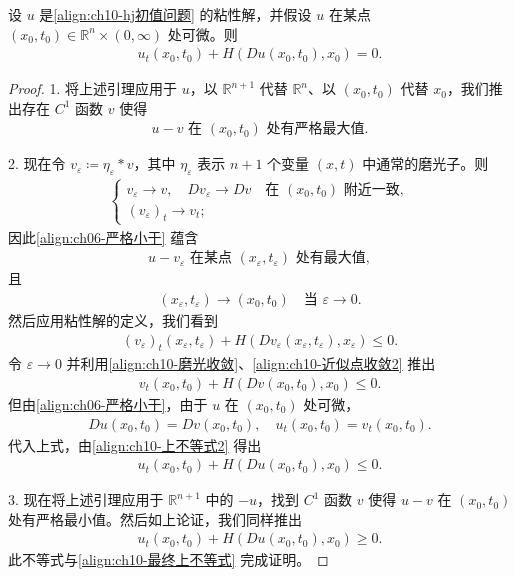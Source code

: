 \documentclass[../../main.tex]{subfiles}
\begin{document}
\begin{theorem}[粘性解的一致性。]\label{theorem:ch10-粘性解一致性}设 $u$ 是\eqref{align:ch10-hj初值问题} 的粘性解，并假设 $u$ 在某点 $(x_0,t_0)\in\mathbb{R}^n\times(0,\infty)$ 处可微。则
\begin{align*}
u_t(x_0,t_0)+H(Du(x_0,t_0),x_0)=0.
\end{align*}
\end{theorem}

\begin{proof}
1. 将上述引理应用于 $u$，以 $\mathbb{R}^{n+1}$ 代替 $\mathbb{R}^n$、以 $(x_0,t_0)$ 代替 $x_0$，我们推出存在 $C^1$ 函数 $v$ 使得
\begin{align}
u-v \text{ 在 } (x_0,t_0) \text{ 处有严格最大值}.
\label{align:ch06-严格小于}
\end{align}

2. 现在令 $v_\varepsilon\coloneqq\eta_\varepsilon*v$，其中 $\eta_\varepsilon$ 表示 $n+1$ 个变量 $(x,t)$ 中通常的磨光子。则
\begin{align}
\begin{cases}
v_\varepsilon \to v,\quad Dv_\varepsilon \to Dv \quad \text{在 } (x_0,t_0) \text{ 附近一致},\\
(v_\varepsilon)_t \to v_t;
\end{cases}
\label{align:ch10-磨光收敛}
\end{align}
因此\eqref{align:ch06-严格小于} 蕴含
\begin{align}
u-v_\varepsilon \text{ 在某点 } (x_\varepsilon,t_\varepsilon) \text{ 处有最大值},
\label{align:ch10-近似最大点}
\end{align}
且
\begin{align}
(x_\varepsilon,t_\varepsilon) \to (x_0,t_0) \quad \text{当 } \varepsilon\to 0.
\label{align:ch10-近似点收敛2}
\end{align}
然后应用粘性解的定义，我们看到
\begin{align*}
(v_\varepsilon)_t(x_\varepsilon,t_\varepsilon)+H(Dv_\varepsilon(x_\varepsilon,t_\varepsilon),x_\varepsilon)\leqslant 0.
\end{align*}
令 $\varepsilon\to 0$ 并利用\eqref{align:ch10-磨光收敛}、\eqref{align:ch10-近似点收敛2} 推出
\begin{align}
v_t(x_0,t_0)+H(Dv(x_0,t_0),x_0)\leqslant 0.
\label{align:ch10-上不等式2}
\end{align}
但由\eqref{align:ch06-严格小于}，由于 $u$ 在 $(x_0,t_0)$ 处可微，
\begin{align*}
Du(x_0,t_0)=Dv(x_0,t_0),\quad u_t(x_0,t_0)=v_t(x_0,t_0).
\end{align*}
代入上式，由\eqref{align:ch10-上不等式2} 得出
\begin{align}
u_t(x_0,t_0)+H(Du(x_0,t_0),x_0)\leqslant 0.
\label{align:ch10-最终上不等式}
\end{align}

3. 现在将上述引理应用于 $\mathbb{R}^{n+1}$ 中的 $-u$，找到 $C^1$ 函数 $v$ 使得 $u-v$ 在 $(x_0,t_0)$ 处有严格最小值。然后如上论证，我们同样推出
\begin{align*}
u_t(x_0,t_0)+H(Du(x_0,t_0),x_0)\geqslant 0.
\end{align*}
此不等式与\eqref{align:ch10-最终上不等式} 完成证明。
\end{proof}
\end{document}
